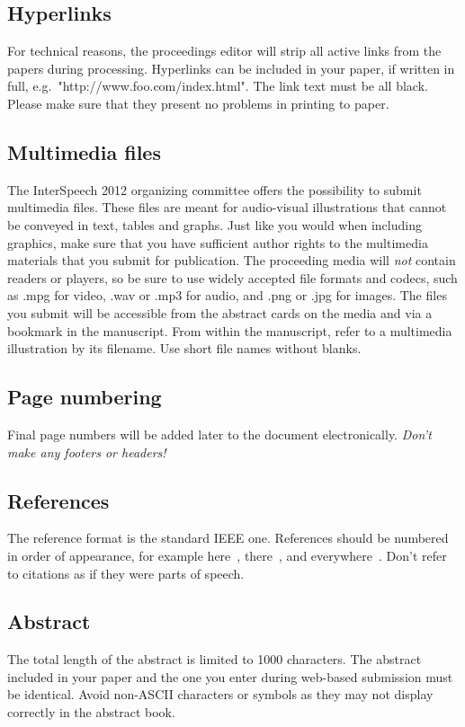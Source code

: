 \documentclass[a4paper]{article}
\begin{document}
\subsection{Hyperlinks}
For technical reasons, the proceedings editor will strip all active links from the papers during processing.
Hyperlinks can be included in your paper, if written in full, e.\thinspace{}g.\ "http://www.foo.com/index.html".
The link text must be all black.
Please make sure that they present no problems in printing to paper.


\subsection{Multimedia files}
The InterSpeech 2012 organizing committee offers the possibility to submit multimedia files.
These files are meant for audio-visual illustrations that cannot be conveyed in text, tables and graphs.
Just like you would when including graphics, make sure that you have sufficient author rights to the multimedia materials that you submit for publication.
The proceeding media will \emph{not} contain readers or players, so be sure to use widely accepted file formats and codecs, such as .mpg for video, .wav or .mp3 for audio,  and .png or .jpg for images.
The files you submit will be accessible from the abstract cards on the media and via a bookmark in the manuscript.
From within the manuscript, refer to a multimedia illustration by its filename.
Use short file names without blanks.


\subsection{Page numbering}
Final page numbers will be added later to the document electronically. 
{\em Don't make any footers or headers!}


\subsection{References}
The reference format is the standard IEEE one.
References should be numbered in order of appearance, 
for example here~\cite{ES1}, there~\cite{ES2}, and everywhere~\cite{ES3}.
Don't refer to citations as if they were parts of speech.


\subsection{Abstract}
The total length of the abstract is limited to 1000 characters.
The abstract included in your paper and the one you enter during web-based submission must be identical.
Avoid non-ASCII characters or symbols as they may not display correctly in the abstract book.
\end{document}

